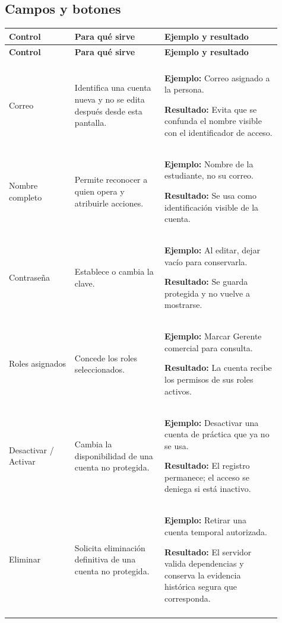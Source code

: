 \subsection{Campos y botones}
\begingroup
\fontsize{10}{12.5}\selectfont
\setlength{\tabcolsep}{5pt}
\renewcommand{\arraystretch}{1.15}
\begin{longtable}{@{}>{\RaggedRight\arraybackslash}p{0.22\linewidth}>{\RaggedRight\arraybackslash}p{0.3\linewidth}>{\RaggedRight\arraybackslash}p{0.39\linewidth}@{}}
\toprule
\textbf{Control} & \textbf{Para qué sirve} & \textbf{Ejemplo y resultado} \\
\midrule
\endfirsthead
\toprule
\textbf{Control} & \textbf{Para qué sirve} & \textbf{Ejemplo y resultado} \\
\midrule
\endhead
\midrule
\multicolumn{3}{r}{\footnotesize Continúa en la página siguiente}\\
\endfoot
\bottomrule
\endlastfoot
Correo & Identifica una cuenta nueva y no se edita después desde esta pantalla. & \textbf{Ejemplo:} Correo asignado a la persona.\par\smallskip\textbf{Resultado:} Evita que se confunda el nombre visible con el identificador de acceso. \\
\addlinespace[3pt]
Nombre completo & Permite reconocer a quien opera y atribuirle acciones. & \textbf{Ejemplo:} Nombre de la estudiante, no su correo.\par\smallskip\textbf{Resultado:} Se usa como identificación visible de la cuenta. \\
\addlinespace[3pt]
Contraseña & Establece o cambia la clave. & \textbf{Ejemplo:} Al editar, dejar vacío para conservarla.\par\smallskip\textbf{Resultado:} Se guarda protegida y no vuelve a mostrarse. \\
\addlinespace[3pt]
Roles asignados & Concede los roles seleccionados. & \textbf{Ejemplo:} Marcar Gerente comercial para consulta.\par\smallskip\textbf{Resultado:} La cuenta recibe los permisos de sus roles activos. \\
\addlinespace[3pt]
Desactivar / Activar & Cambia la disponibilidad de una cuenta no protegida. & \textbf{Ejemplo:} Desactivar una cuenta de práctica que ya no se usa.\par\smallskip\textbf{Resultado:} El registro permanece; el acceso se deniega si está inactivo. \\
\addlinespace[3pt]
Eliminar & Solicita eliminación definitiva de una cuenta no protegida. & \textbf{Ejemplo:} Retirar una cuenta temporal autorizada.\par\smallskip\textbf{Resultado:} El servidor valida dependencias y conserva la evidencia histórica segura que corresponda. \\
\addlinespace[3pt]
\end{longtable}
\endgroup

